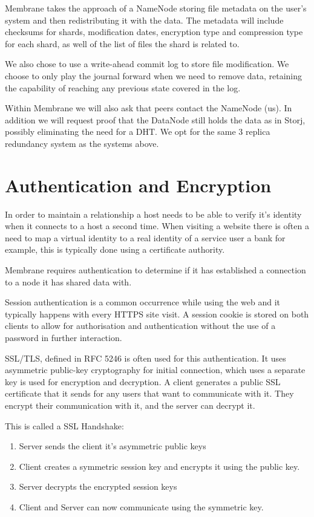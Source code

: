 \documentclass[11pt, a4paper, twoside]{report}
\begin{document}
Membrane takes the approach of a NameNode storing file metadata on the user's system and then redistributing it with the data. The metadata will include checksums for shards, modification dates, encryption type and compression type for each shard, as well of the list of files the shard is related to.

We also chose to use a write-ahead commit log to store file modification. We choose to only play the journal forward when we need to remove data, retaining the capability of reaching any previous state covered in the log.

Within Membrane we will also ask that peers contact the NameNode (us). In addition we will request proof that the DataNode still holds the data as in Storj, possibly eliminating the need for a DHT. We opt for the same 3 replica redundancy system as the systems above.

\section{Authentication and Encryption} \label{sec:encryption}

In order to maintain a relationship a host needs to be able to verify it's identity when it connects to a host a second time. When visiting a website there is often a need to map a virtual identity to a real identity of a service user \citep{hericourt2001method} a bank for example, this is typically done using a certificate authority.

Membrane requires authentication to determine if it has established a connection to a node it has shared data with.

Session authentication is a common occurrence while using the web and it typically happens with every HTTPS site visit. A session cookie is stored on both clients to allow for authorisation and authentication without the use of a password in further interaction. \citep{mayo2008security}

SSL/TLS, defined in RFC 5246 \citep{dierks2008transport} is often used for this authentication. It uses asymmetric public-key cryptography for initial connection, which uses a separate key is used for encryption and decryption. A client generates a public SSL certificate that it sends for any users that want to communicate with it. They encrypt their communication with it, and the server can decrypt it.

This is called a SSL Handshake:

\begin{enumerate}
 \item Server sends the client it's asymmetric public keys
 \item Client creates a symmetric session key and encrypts it using the public key.
 \item Server decrypts the encrypted session keys
 \item Client and Server can now communicate using the symmetric key.
\end{enumerate}
\end{document}
